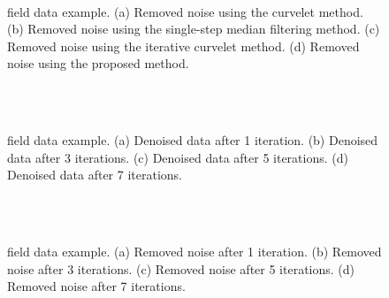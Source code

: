 {\begin{figure}[htb!]
	\centering
    \\
	\caption{ field data example. (a) Removed noise using the curvelet method. (b) Removed noise using the single-step median filtering method. (c) Removed noise using the iterative curvelet method. (d) Removed noise using the proposed method. }
	\label{fig:f_d_n}
\end{figure}

\begin{figure}[htb!]
	\centering
    \\
    \\
	\caption{ field data example. (a) Denoised data after 1 iteration. (b) Denoised data after 3 iterations.  (c) Denoised data after 5 iterations. (d) Denoised data after 7 iterations. }
	\label{fig:f_ds}
\end{figure}

\begin{figure}[htb!]
	\centering
    \\
    \\
	\caption{ field data example. (a) Removed noise after 1 iteration. (b) Removed noise after 3 iterations.  (c) Removed noise after 5 iterations. (d) Removed noise after 7 iterations. }
	\label{fig:f_ns}
\end{figure}



}
